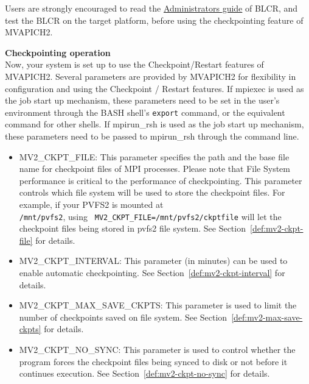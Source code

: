 Users are strongly encouraged to read the
\href{http://upc-bugs.lbl.gov/blcr/doc/html/BLCR\_Admin\_Guide.html}{Administrators
guide} of BLCR, and test the BLCR on the target platform, before using the
checkpointing feature of MVAPICH2.

\noindent\textbf{Checkpointing operation}\\

Now, your system is set up to use the Checkpoint/Restart features of MVAPICH2.
Several parameters are provided by MVAPICH2 for flexibility in configuration and
using the Checkpoint / Restart features. If mpiexec is used as the job start up
mechanism, these parameters need to be set in the user's environment through the
BASH shell's \texttt{export} command, or the equivalent command for other
shells. If mpirun\_rsh is used as the job start up mechanism, these parameters
need to be passed to mpirun\_rsh through the command line.

\begin{itemize}
  \item{MV2\_CKPT\_FILE}: This parameter specifies the path and
    the base file name for checkpoint files of MPI processes.
    Please note that File System performance is critical to
    the performance of checkpointing. This parameter
    controls which file system will be used to store the
    checkpoint files. For example, if your PVFS2 is mounted
    at\\ \texttt{/mnt/pvfs2}, using \texttt{
    MV2\_CKPT\_FILE=/mnt/pvfs2/ckptfile} will let the
    checkpoint files being stored in pvfs2 file system. See
    Section~\ref{def:mv2-ckpt-file} for details.

  \item{MV2\_CKPT\_INTERVAL}: This parameter (in minutes) can be used to
    enable automatic checkpointing. See
    Section~\ref{def:mv2-ckpt-interval} for details.

  \item{MV2\_CKPT\_MAX\_SAVE\_CKPTS}: This parameter is used to
    limit the number of checkpoints saved on file system.
    See Section~\ref{def:mv2-max-save-ckpts} for details.

  \item{MV2\_CKPT\_NO\_SYNC}: This parameter is used to control
    whether the program forces the checkpoint files being
    synced to disk or not before it continues execution.
    See Section~\ref{def:mv2-ckpt-no-sync} for details.

\end{itemize}

